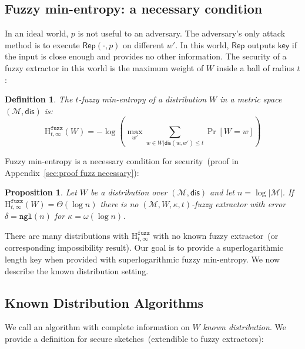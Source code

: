 \documentclass[11pt]{article}
\newcommand{\apref}[1]{\mbox{Appendix~\ref{#1}}}
\newcommand{\lemref}[1]{\mbox{Lemma~\ref{#1}}}
\newcommand{\class}[1]{{\ensuremath{\mathsf{#1}}}}
\newcommand{\key}{\ensuremath{\class{key}}\xspace}
\newcommand{\rep}{\ensuremath{\class{Rep}}\xspace}
\newcommand{\dis}{\ensuremath{\mathsf{dis}}}
\newcommand{\ngl}{\ensuremath{\mathtt{ngl}}\xspace}
\newcommand{\Hfuzz}{\mathrm{H}^{\mathtt{fuzz}}_{t,\infty}}
\newtheorem{proposition}[theorem]{Proposition}
\newtheorem{definition}[theorem]{Definition}
\begin{document}
\subsection{Fuzzy min-entropy: a necessary condition}
\label{sec:minimal conditions}

In an ideal world, $p$ is not useful to an adversary.  The adversary's only attack method is to execute $\rep(\cdot, p)$ on different $w'$.  In this world, $\rep$ outputs $\key$ if the input is close enough and provides no other  information.  The security of a fuzzy extractor in this world is the maximum weight of $W$ inside a ball of radius $t$:

\begin{definition}
\label{def:fuzzy min-ent}
The $t$-fuzzy min-entropy of a distribution $W$ in a metric space $(\mathcal{M}, \dis)$ is:
\[
\Hfuzz(W) = -\log \left(\max_{w'}  \sum_{w\in W | \dis(w, w')\le t} \Pr[W=w] \right)
\]
\end{definition}
\noindent
Fuzzy min-entropy is a necessary condition for security~(proof in \apref{sec:proof fuzz necessary}):
\begin{proposition}
\label{prop:fuzz necessary}
Let $W$ be a distribution over $(\mathcal{M}, \dis)$ and let $n= \log |\mathcal{M}|$.
If $\Hfuzz (W) = \Theta(\log n)$ there is no $(\mathcal{M}, W, \kappa, t)$-fuzzy extractor %
 with error $\delta = \ngl(n)$ for $\kappa =\omega(\log n)$.
\end{proposition}

\noindent
There are many distributions with $\Hfuzz$ with no known fuzzy extractor~(or corresponding impossibility result).
Our goal is to provide a superlogarithmic length key when provided with superlogarithmic fuzzy min-entropy.  We now describe the known distribution setting.

\subsection{Known Distribution Algorithms}
\label{sec:known distributions def}
We call an algorithm with complete information on $W$ \emph{known distribution}.  We provide a definition for secure sketches~(extendible to fuzzy extractors):
\end{document}
